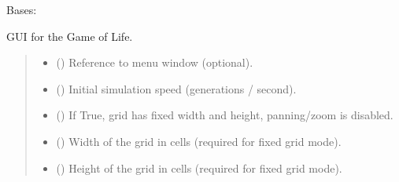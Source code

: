 \documentclass[letterpaper,10pt,oneside,english]{sphinxhowto}
\begin{document}
\begin{fulllineitems}
\label{\detokenize{gui:gui.game_gui.GameOfLifeGUI}}
\pysigstartsignatures
\pysiglinewithargsret
{}
{\sphinxparamcomma {}\sphinxparamcomma {}\sphinxparamcomma {}\sphinxparamcomma {}\sphinxparamcomma {}}
{}
\pysigstopsignatures
\sphinxAtStartPar
Bases: 

\sphinxAtStartPar
GUI for the Game of Life.
\begin{quote}\begin{description}
\begin{itemize}
\item {} 
\sphinxAtStartPar
{} () \textendash{} Reference to menu window (optional).

\item {} 
\sphinxAtStartPar
{} () \textendash{} Initial simulation speed (generations / second).

\item {} 
\sphinxAtStartPar
{} () \textendash{} If True, grid has fixed width and height, panning/zoom is disabled.

\item {} 
\sphinxAtStartPar
{} (\sphinxstyleliteralemphasis{\sphinxupquote{, }}) \textendash{} Width of the grid in cells (required for fixed grid mode).

\item {} 
\sphinxAtStartPar
{} (\sphinxstyleliteralemphasis{\sphinxupquote{, }}) \textendash{} Height of the grid in cells (required for fixed grid mode).


\end{itemize}
\end{description}
\end{quote}
\end{fulllineitems}
\end{document}
